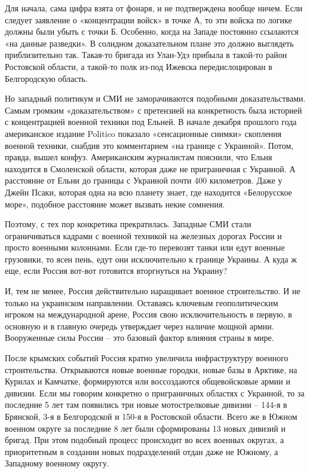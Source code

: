 Для начала, сама цифра взята от фонаря, и не подтверждена вообще ничем. Если
следует заявление о «концентрации войск» в точке А, то эти войска по логике
должны были убыть с точки Б. Особенно, когда на Западе постоянно ссылаются «на
данные разведки». В солидном доказательном плане это должно выглядеть
приблизительно так. Такая-то бригада из Улан-Удэ прибыла в такой-то район
Ростовской области, а такой-то полк из-под Ижевска передислоцирован в
Белгородскую область.

Но западный политикум и СМИ не заморачиваются подобными доказательствами. Самым
громким «доказательством» с претензией на конкретность была историей с
концентрацией военной техники под Ельней. В начале декабря прошлого года
американское издание Politico показало «сенсационные снимки» скопления военной
техники, снабдив это комментарием «на границе с Украиной». Потом, правда, вышел
конфуз. Американским журналистам пояснили, что Ельня находится в Смоленской
области, которая даже не приграничная с Украиной. А расстояние от Ельни до
границы с Украиной почти 400 километров. Даже у Джейн Псаки, которая одна на
всю планету знает, где находится «Белорусское море», подобное расстояние может
вызвать некие сомнения.

Поэтому, с тех пор конкретика прекратилась. Западные СМИ стали ограничиваться
кадрами с военной техникой на железных дорогах России и просто военными
колоннами. Если где-то перевозят танки или едут военные грузовики, то ясен
пень, едут они исключительно к границе Украины. А куда ж еще, если Россия
вот-вот готовится вторгнуться на Украину?

И, тем не менее, Россия действительно наращивает военное строительство. И не
только на украинском направлении. Оставаясь ключевым геополитическим игроком на
международной арене, Россия свою исключительность в первую, в основную и в
главную очередь утверждает через наличие мощной армии. Вооруженные силы России
– это базовый фактор влияния страны в мире.

После крымских событий Россия кратно увеличила инфраструктуру военного
строительства. Открываются новые военные городки, новые базы в Арктике, на
Курилах и Камчатке, формируются или воссоздаются общевойсковые армии и дивизии.
Если мы говорим конкретно о приграничных областях с Украиной, то за последние 5
лет там появились три новые мотострелковые дивизии – 144-я в Брянской, 3-я в
Белгородской и 150-я в Ростовской области. Всего же в Южном военном округе за
последние 8 лет были сформированы 13 новых дивизий и бригад. При этом подобный
процесс происходит во всех военных округах, а приоритетным в создании новых
подразделений отдан даже не Южному, а Западному военному округу.
